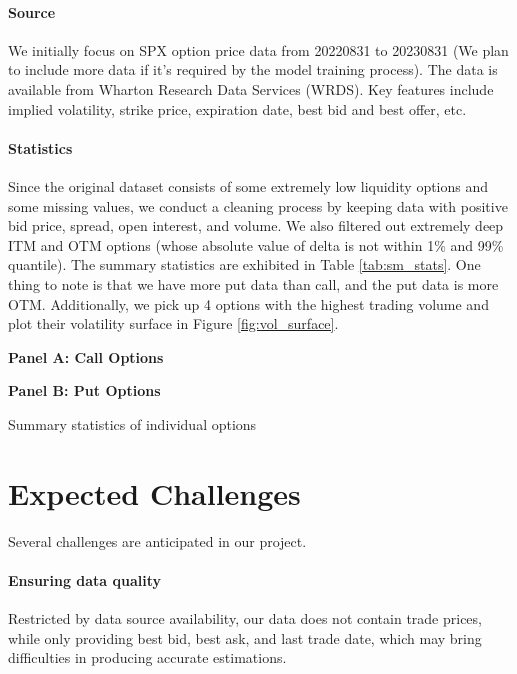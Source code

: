 \documentclass{article}
\newcommand{\figref}[1]{Figure \ref{#1}}
\newcommand{\tabref}[1]{Table \ref{#1}}
\begin{document}
\paragraph{Source} We initially focus on SPX option price data from 20220831 to 20230831 (We plan to include more data if it's required by the model training process). The data is available from  Wharton Research Data Services (WRDS). Key features include implied volatility, strike price, expiration date, best bid and best offer, etc.
\paragraph{Statistics} Since the original dataset consists of some extremely low liquidity options and some missing values, we conduct a cleaning process by keeping data with positive bid price, spread, open interest, and volume. We also filtered out extremely deep ITM and OTM options (whose absolute value of delta is not within 1\% and 99\% quantile). The summary statistics are exhibited in \tabref{tab:sm_stats}. One thing to note is that we have more put data than call, and the put data is more OTM. Additionally, we pick up 4 options with the highest trading volume and plot their volatility surface in \figref{fig:vol_surface}.


\begin{table}[h]
    \centering
    \textbf{Panel A: Call Options}
    \resizebox{\textwidth}{!}{}
    \vspace{5pt}

    \textbf{Panel B: Put Options}
    \resizebox{\textwidth}{!}{}
    \vspace{5pt}

    \caption{Summary statistics of individual options}
    \label{tab:sm_stats}
\end{table}



\section{Expected Challenges}

Several challenges are anticipated in our project.
\paragraph{Ensuring data quality}
Restricted by data source availability, our data does not contain trade prices, while only providing best bid, best ask, and last trade date, which may bring difficulties in producing accurate estimations.
\end{document}
